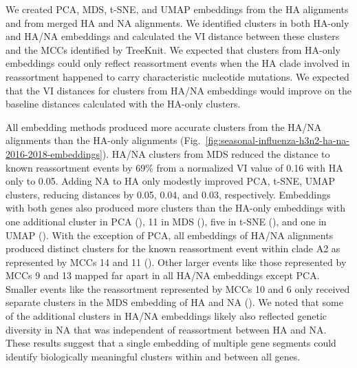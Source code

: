 \documentclass[10pt,letterpaper]{article}
\begin{document}
We created PCA, MDS, t-SNE, and UMAP embeddings from the HA alignments and from merged HA and NA alignments.
We identified clusters in both HA-only and HA/NA embeddings and calculated the VI distance between these clusters and the MCCs identified by TreeKnit.
We expected that clusters from HA-only embeddings could only reflect reassortment events when the HA clade involved in reassortment happened to carry characteristic nucleotide mutations.
We expected that the VI distances for clusters from HA/NA embeddings would improve on the baseline distances calculated with the HA-only clusters.

All embedding methods produced more accurate clusters from the HA/NA alignments than the HA-only alignments (Fig.~\ref{fig:seasonal-influenza-h3n2-ha-na-2016-2018-embeddings}).
HA/NA clusters from MDS reduced the distance to known reassortment events by 69\% from a normalized VI value of 0.16 with HA only to 0.05.
Adding NA to HA only modestly improved PCA, t-SNE, UMAP clusters, reducing distances by 0.05, 0.04, and 0.03, respectively.
Embeddings with both genes also produced more clusters than the HA-only embeddings with one additional cluster in PCA (), 11 in MDS (), five in t-SNE (), and one in UMAP ().
With the exception of PCA, all embeddings of HA/NA alignments produced distinct clusters for the known reassortment event within clade A2 \cite{Potter2019} as represented by MCCs 14 and 11 ().
Other larger events like those represented by MCCs 9 and 13 mapped far apart in all HA/NA embeddings except PCA.
Smaller events like the reassortment represented by MCCs 10 and 6 only received separate clusters in the MDS embedding of HA and NA ().
We noted that some of the additional clusters in HA/NA embeddings likely also reflected genetic diversity in NA that was independent of reassortment between HA and NA.
These results suggest that a single embedding of multiple gene segments could identify biologically meaningful clusters within and between all genes.
\end{document}
